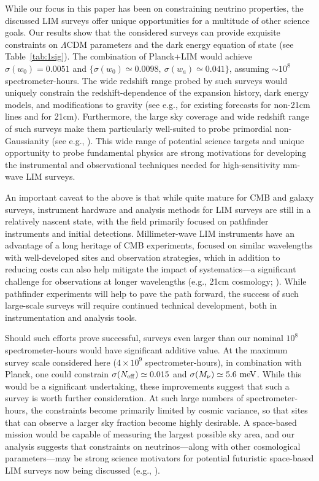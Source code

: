 \documentclass[twocolumn]{aastex631}
\begin{document}
While our focus in this paper has been on constraining neutrino properties, the discussed LIM surveys offer unique opportunities for a multitude of other science goals. Our results show that the considered surveys can provide exquisite constraints on $\Lambda$CDM parameters and the dark energy equation of state (see Table~\ref{tab:1sig}). The combination of Planck+LIM would achieve $\sigma(w_0) = 0.0051 $ and $\{ \sigma(w_0) \simeq 0.0098, \ \sigma(w_a) \simeq 0.041 \}$, assuming $\sim 10^8$ spectrometer-hours. The wide redshift range probed by such surveys would uniquely constrain the redshift-dependence of the expansion history, dark energy models, and modifications to gravity (see e.g., \citealt{Karkare:2018sar,Bernal:2019gfq} for existing forecasts for non-21cm lines and \citealt{Lorenz:2017fgo,Sailer:2021yzm} for 21cm). Furthermore, the large sky coverage and wide redshift range of such surveys make them particularly well-suited to probe primordial non-Gaussianity (see e.g., \citealt{MoradinezhadDizgah:2018zrs,MoradinezhadDizgah:2018lac,Liu:2020izx,Viljoen:2021ypp}). This wide range of potential science targets and unique opportunity to probe fundamental physics are strong motivations for developing the instrumental and observational techniques needed for high-sensitivity mm-wave LIM surveys.

An important caveat to the above is that while quite mature for CMB and galaxy surveys, instrument hardware and analysis methods for LIM surveys are still in a relatively nascent state, with the field primarily focused on pathfinder instruments and initial detections. Millimeter-wave LIM instruments have an advantage of a long heritage of CMB experiments, focused on similar wavelengths with well-developed sites and observation strategies, which in addition to reducing costs can also help mitigate the impact of systematics---a significant challenge for observations at longer wavelengths (e.g., 21cm cosmology; \citealt{Nasirudin_2020}). While pathfinder experiments will help to pave the path forward, the success of such large-scale surveys will require continued technical development, both in instrumentation and analysis tools.  

Should such efforts prove successful, surveys even larger than our nominal $10^{8}$ spectrometer-hours would have significant additive value. At the maximum survey scale considered here ($4\times10^{9}$ spectrometer-hours), in combination with Planck, one could constrain $\sigma(N_{\rm eff}) \simeq 0.015$ and $\sigma(M_\nu) \simeq 5.6 \ {\rm meV}$. While this would be a significant undertaking, these improvements suggest that such a survey is worth further consideration. At such large numbers of spectrometer-hours, the constraints become primarily limited by cosmic variance, so that sites that can observe a larger sky fraction become highly desirable. A space-based mission would be capable of measuring the largest possible sky area, and our analysis suggests that constraints on neutrinos---along with other cosmological parameters---may be strong science motivators for potential futuristic space-based LIM surveys now being discussed (e.g., \citealt{Delabrouille:2019thj,Silva2021}). %
\end{document}

